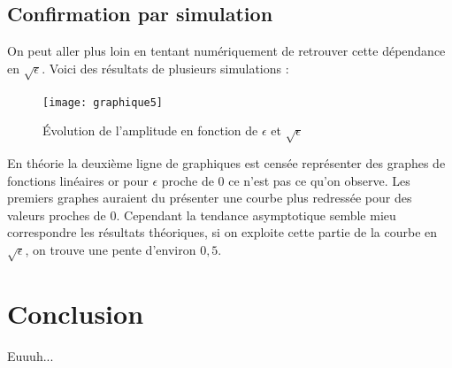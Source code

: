 \documentclass[12pt,a4paper]{article}
\begin{document}
\subsection{Confirmation par simulation}
On peut aller plus loin en tentant numériquement de retrouver cette dépendance en $\sqrt{\epsilon}$. Voici des résultats de plusieurs simulations : 
\begin{figure}[h!]
\centering
\texttt{[image: graphique5]}
\caption{\'Evolution de l'amplitude en fonction de $\epsilon$ et $\sqrt{\epsilon}$
         \label{fig:exemple}}
\end{figure}
En théorie la deuxième ligne de graphiques est censée représenter des graphes de fonctions linéaires or pour $\epsilon$ proche de 0 ce n'est pas ce qu'on observe. Les premiers graphes auraient du présenter une courbe plus redressée pour des valeurs proches de 0. Cependant la tendance asymptotique semble mieu correspondre les résultats théoriques, si on exploite cette partie de la courbe en $\sqrt{\epsilon}$, on trouve une pente d'environ $0,5$.

\section{Conclusion} 
Euuuh...
\end{document}
